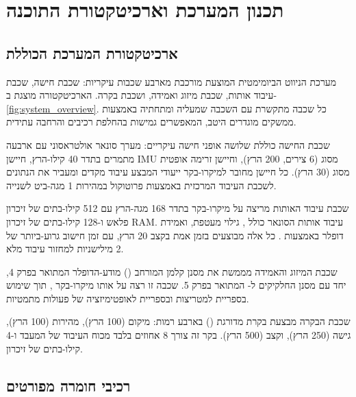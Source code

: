 

\section{תכנון המערכת וארכיטקטורת התוכנה}
\label{sec:ch07_system_design}

\subsection{ארכיטקטורת המערכת הכוללת}
\label{sec:ch07_architecture}

מערכת הניווט הביומימטית המוצעת מורכבת מארבע שכבות עיקריות: שכבת חישה, שכבת עיבוד אותות, שכבת מיזוג ואמידה, ושכבת בקרה. הארכיטקטורה מוצגת ב-\ref{fig:system_overview}. כל שכבה מתקשרת עם השכבה שמעליה ומתחתיה באמצעות ממשקים מוגדרים היטב, המאפשרים גמישות בהחלפת רכיבים והרחבה עתידית.

שכבת החישה כוללת שלושה אופני חישה עיקריים: מערך סונאר אולטראסוני עם ארבעה מתמרים בתדר 40 קילו-הרץ, חיישן IMU מסוג  (6 צירים, 200 הרץ), וחיישן זרימה אופטית מסוג  (30 הרץ). כל חיישן מחובר למיקרו-בקר ייעודי המבצע עיבוד מקדים ומעביר את הנתונים לשכבת העיבוד המרכזית באמצעות פרוטוקול  במהירות 1 מגה-ביט לשנייה.

שכבת עיבוד האותות מריצה על מיקרו-בקר  בתדר 168 מגה-הרץ עם 512 קילו-בתים של זיכרון פלאש ו-128 קילו-בתים של זיכרון RAM. עיבוד אותות הסונאר כולל , גילוי מעטפת, ואמידת דופלר באמצעות . כל אלה מבוצעים בזמן אמת בקצב 20 הרץ, עם זמן חישוב גרוע-ביותר של 2 מילישניות למחזור עיבוד מלא.

שכבת המיזוג והאמידה מממשת את מסנן קלמן המורחב () מודע-הדופלר המתואר בפרק 4, יחד עם מסנן החלקיקים ל- המתואר בפרק 5. שכבה זו רצה על אותו מיקרו-בקר , תוך שימוש בספריית  למטריצות ובספריית  לאופטימיזציה של פעולות מתמטיות.

שכבת הבקרה מבצעת בקרת  מדורגת () בארבע רמות: מיקום (100 הרץ), מהירות (100 הרץ), גישה (250 הרץ), וקצב (500 הרץ). בקר זה צורך 8 אחוזים בלבד מכוח העיבוד של המעבד ו-4 קילו-בתים של זיכרון.

\subsection{רכיבי חומרה מפורטים}
\label{sec:ch07_hardware}

